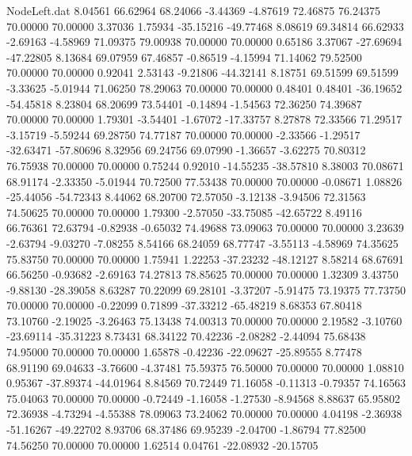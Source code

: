 \begin{filecontents}{NodeLeft.dat}
   8.04561   66.62964   68.24066    -3.44369   -4.87619   72.46875   76.24375   70.00000   70.00000    3.37036    1.75934  -35.15216  -49.77468
   8.08619   69.34814   66.62933    -2.69163   -4.58969   71.09375   79.00938   70.00000   70.00000    0.65186    3.37067  -27.69694  -47.22805
   8.13684   69.07959   67.46857    -0.86519   -4.15994   71.14062   79.52500   70.00000   70.00000    0.92041    2.53143   -9.21806  -44.32141
   8.18751   69.51599   69.51599    -3.33625   -5.01944   71.06250   78.29063   70.00000   70.00000    0.48401    0.48401  -36.19652  -54.45818
   8.23804   68.20699   73.54401    -0.14894   -1.54563   72.36250   74.39687   70.00000   70.00000    1.79301   -3.54401   -1.67072  -17.33757
   8.27878   72.33566   71.29517    -3.15719   -5.59244   69.28750   74.77187   70.00000   70.00000   -2.33566   -1.29517  -32.63471  -57.80696
   8.32956   69.24756   69.07990    -1.36657   -3.62275   70.80312   76.75938   70.00000   70.00000    0.75244    0.92010  -14.55235  -38.57810
   8.38003   70.08671   68.91174    -2.33350   -5.01944   70.72500   77.53438   70.00000   70.00000   -0.08671    1.08826  -25.44056  -54.72343
   8.44062   68.20700   72.57050    -3.12138   -3.94506   72.31563   74.50625   70.00000   70.00000    1.79300   -2.57050  -33.75085  -42.65722
   8.49116   66.76361   72.63794    -0.82938   -0.65032   74.49688   73.09063   70.00000   70.00000    3.23639   -2.63794   -9.03270   -7.08255
   8.54166   68.24059   68.77747    -3.55113   -4.58969   74.35625   75.83750   70.00000   70.00000    1.75941    1.22253  -37.23232  -48.12127
   8.58214   68.67691   66.56250    -0.93682   -2.69163   74.27813   78.85625   70.00000   70.00000    1.32309    3.43750   -9.88130  -28.39058
   8.63287   70.22099   69.28101    -3.37207   -5.91475   73.19375   77.73750   70.00000   70.00000   -0.22099    0.71899  -37.33212  -65.48219
   8.68353   67.80418   73.10760    -2.19025   -3.26463   75.13438   74.00313   70.00000   70.00000    2.19582   -3.10760  -23.69114  -35.31223
   8.73431   68.34122   70.42236    -2.08282   -2.44094   75.68438   74.95000   70.00000   70.00000    1.65878   -0.42236  -22.09627  -25.89555
   8.77478   68.91190   69.04633    -3.76600   -4.37481   75.59375   76.50000   70.00000   70.00000    1.08810    0.95367  -37.89374  -44.01964
   8.84569   70.72449   71.16058    -0.11313   -0.79357   74.16563   75.04063   70.00000   70.00000   -0.72449   -1.16058   -1.27530   -8.94568
   8.88637   65.95802   72.36938    -4.73294   -4.55388   78.09063   73.24062   70.00000   70.00000    4.04198   -2.36938  -51.16267  -49.22702
   8.93706   68.37486   69.95239    -2.04700   -1.86794   77.82500   74.56250   70.00000   70.00000    1.62514    0.04761  -22.08932  -20.15705

\end{filecontents}
